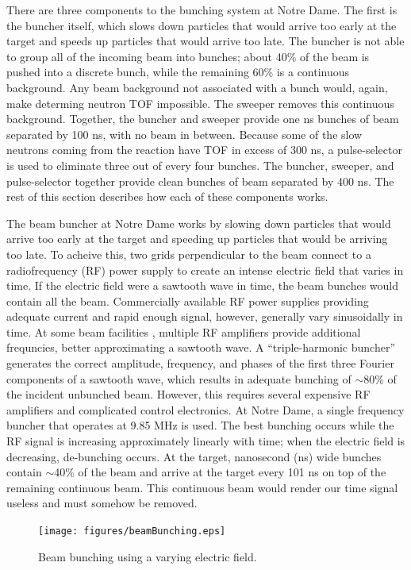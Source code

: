 There are three components to the bunching system at Notre Dame.  The first is the buncher itself, which slows down particles that would arrive too early at the target and speeds up particles that would arrive too late.  The buncher is not able to group all of the incoming beam into bunches; about 40\% of the beam is pushed into a discrete bunch, while the remaining 60\% is a continuous background.  Any beam background not associated with a bunch would, again, make determing neutron TOF impossible.  The sweeper removes this continuous background.  Together, the buncher and sweeper provide one ns bunches of beam separated by 100 ns, with no beam in between.  Because some of the slow neutrons coming from the reaction have TOF in excess of 300 ns, a pulse-selector is used to eliminate three out of every four bunches.  The buncher, sweeper, and pulse-selector together provide clean bunches of beam separated by 400 ns.  The rest of this section describes how each of these components works.

The beam buncher at Notre Dame works by slowing down particles that would arrive too early at the target and speeding up particles that would be arriving too late.  To acheive this, two grids perpendicular to the beam connect to a radiofrequency (RF) power supply to create an intense electric field that varies in time.  If the electric field were a sawtooth wave in time, the beam bunches would contain all the beam.  Commercially available RF power supplies providing adequate current and rapid enough signal, however, generally vary sinusoidally in time.  At some beam facilities \cite{LynchBunching}, multiple RF amplifiers provide additional frequncies, better approximating a sawtooth wave.  A ``triple-harmonic buncher'' \cite{LynchBunching} generates the correct amplitude, frequency, and phases of the first three Fourier components of a sawtooth wave, which results in adequate bunching of $\sim$80\% of the incident unbunched beam.  However, this requires several expensive RF amplifiers and complicated control electronics.  At Notre Dame, a single frequency buncher that operates at 9.85 MHz is used.  The best bunching occurs while the RF signal is increasing approximately linearly with time; when the electric field is decreasing, de-bunching occurs.  At the target, nanosecond (ns) wide bunches contain $\sim$40\% of the beam and arrive at the target every 101 ns on top of the remaining continuous beam.  This continuous beam would render our time signal useless and must somehow be removed.

\begin{figure}[htp]
\centering
\texttt{[image: figures/beamBunching.eps]}
\label{fig:bunching}
\caption{Beam bunching using a varying electric field.}
\end{figure}

